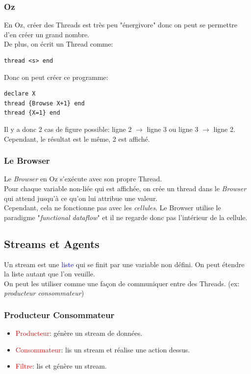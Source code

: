 \documentclass{report}
\begin{document}
\subsubsection{Oz}
En Oz, créer des Threads est très peu "énergivore" donc on peut se permettre d'en créer un grand nombre.\\
De plus, on écrit un Thread comme:
\begin{lstlisting}[escapechar=\%]
thread <s> end
\end{lstlisting}
\noindent
Donc on peut créer ce programme:
\begin{lstlisting}[escapechar=\%]
declare X
thread {Browse X+1} end
thread {X=1} end
\end{lstlisting}
Il y a donc 2 cas de figure possible: ligne 2 $\rightarrow$ ligne 3 ou ligne 3 $\rightarrow$ ligne 2. Cependant, le résultat est le même, 2 est affiché.

\subsubsection{Le Browser}
Le \textit{Browser} en Oz s'exécute avec son propre Thread.\\
Pour chaque variable non-liée qui est affichée, on crée un thread dans le \textit{Browser} qui attend jusqu'à ce qu'on lui attribue une valeur.\\
Cependant, cela ne fonctionne pas avec les \textit{cellules}. Le Browser utilise le paradigme "\textit{functional dataflow}" et il ne regarde donc pas l'intérieur de la cellule.

\subsection{Streams et Agents}
Un stream est une \textcolor{blue}{liste} qui se finit par une variable non défini. On peut étendre la liste autant que l'on veuille. \\
On peut les utiliser comme une façon de communiquer entre des Threads. (ex: \textit{producteur consommateur})

\subsubsection{Producteur Consommateur}
\begin{itemize}
\item \textcolor{red}{Producteur}: génère un stream de données.
\item \textcolor{red}{Consommateur}: lis un stream et réalise une action dessus.
\item \textcolor{red}{Filtre}: lis et génère un stream.
\end{itemize} 
\end{document}
